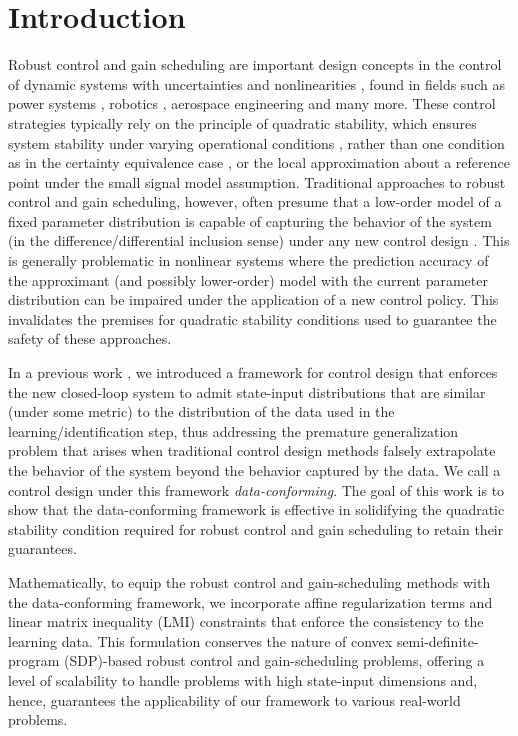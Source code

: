 \documentclass[letterpaper, 10 pt, conference]{ieeeconf}
\begin{document}
\section{Introduction} \label{section: Introduction}
Robust control and gain scheduling are important design concepts in the control of dynamic systems with uncertainties and nonlinearities \cite{petersen2014robust}, found in fields such as power systems \cite{mohammadi2021robust,rimorov2022gain}, robotics \cite{ryan2013lmi}, aerospace engineering \cite{liu2023robust} and many more. These control strategies typically rely on the principle of quadratic stability, which ensures system stability under varying operational conditions \cite{dorato1987historical}, rather than one condition as in the certainty equivalence case \cite{aastrom2012introduction}, or the local approximation about a reference point under the small signal model assumption. Traditional approaches to robust control and gain scheduling, however, often presume that a low-order model of a fixed parameter distribution is capable of capturing the behavior of the system (in the difference/differential inclusion sense) under any new control design \cite{scherer2006lmi}. This is generally problematic in nonlinear systems where the prediction accuracy of the approximant (and possibly lower-order) model with the current parameter distribution can be impaired under the application of a new control policy. This invalidates the premises for quadratic stability conditions used to guarantee the safety of these approaches.

In a previous work \cite{ramadan2024data}, we introduced a framework for control design that enforces the new closed-loop system to admit state-input distributions that are similar  (under some metric) to the distribution of the data used in the learning/identification step, thus addressing the premature generalization problem that arises when traditional control design methods falsely extrapolate the behavior of the system beyond the behavior captured by the data. We call a control design under this framework \textit{data-conforming}. The goal of this work is to show that the data-conforming framework is effective in solidifying the quadratic stability condition required for robust control and gain scheduling to retain their guarantees.

Mathematically, to equip the robust control and gain-scheduling methods with the data-conforming framework, we incorporate affine regularization terms and linear matrix inequality (LMI) constraints that enforce the consistency to the learning data. This formulation conserves the nature of convex semi-definite-program (SDP)-based robust control and gain-scheduling problems, offering a level of scalability to handle problems with high state-input dimensions and, hence, guarantees the applicability of our framework to various real-world problems.
\end{document}
